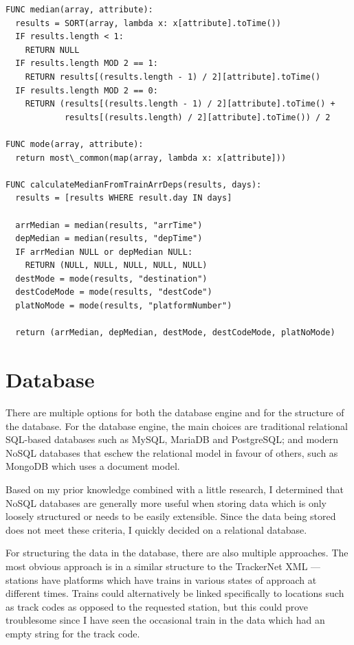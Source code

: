 \documentclass[a4paper,12pt,twoside]{report}
\begin{document}
\begin{lstlisting}
FUNC median(array, attribute):
  results = SORT(array, lambda x: x[attribute].toTime())
  IF results.length < 1:
    RETURN NULL
  IF results.length MOD 2 == 1:
    RETURN results[(results.length - 1) / 2][attribute].toTime()
  IF results.length MOD 2 == 0:
    RETURN (results[(results.length - 1) / 2][attribute].toTime() +
            results[(results.length) / 2][attribute].toTime()) / 2

FUNC mode(array, attribute):
  return most\_common(map(array, lambda x: x[attribute]))

FUNC calculateMedianFromTrainArrDeps(results, days):
  results = [results WHERE result.day IN days]

  arrMedian = median(results, "arrTime")
  depMedian = median(results, "depTime")
  IF arrMedian NULL or depMedian NULL:
    RETURN (NULL, NULL, NULL, NULL, NULL)
  destMode = mode(results, "destination")
  destCodeMode = mode(results, "destCode")
  platNoMode = mode(results, "platformNumber")

  return (arrMedian, depMedian, destMode, destCodeMode, platNoMode)
\end{lstlisting}

\section{Database}

There are multiple options for both the database engine and for the structure
of the database. For the database engine, the main choices are traditional
relational SQL-based databases such as MySQL, MariaDB and PostgreSQL; and
modern NoSQL databases that eschew the relational model in favour of others,
such as MongoDB which uses a document model.

Based on my prior knowledge combined with a little research, I determined that
NoSQL databases are generally more useful when storing data which is only
loosely structured or needs to be easily extensible. Since the data being
stored does not meet these criteria, I quickly decided on a relational
database.

For structuring the data in the database, there are also multiple approaches.
The most obvious approach is in a similar structure to the TrackerNet XML ---
stations have platforms which have trains in various states of approach at
different times. Trains could alternatively be linked specifically to locations
such as track codes as opposed to the requested station, but this could prove
troublesome since I have seen the occasional train in the data which had an
empty string for the track code.
\end{document}
